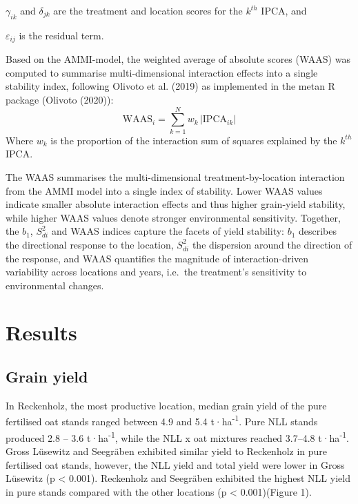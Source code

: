\documentclass[
  british,
  a4paper,
  DIV=11,
  numbers=noendperiod]{scrreprt}
\begin{document}
\(\gamma_{ik}\) and \(\delta_{jk}\) are the treatment and location
scores for the \(k^{th}\) IPCA, and

\(\varepsilon_{ij}\) is the residual term.

Based on the AMMI-model, the weighted average of absolute scores (WAAS)
was computed to summarise multi‐dimensional interaction effects into a
single stability index, following Olivoto et al. (2019) as implemented
in the metan R package (Olivoto (2020)): \[
\text{WAAS}_i = \sum_{k=1}^{N} w_k \, \big| \text{IPCA}_{ik} \big| \tag{5}
\] Where \(w_k\) is the proportion of the interaction sum of squares
explained by the \(k^{th}\) IPCA.

The WAAS summarises the multi-dimensional treatment-by-location
interaction from the AMMI model into a single index of stability. Lower
WAAS values indicate smaller absolute interaction effects and thus
higher grain-yield stability, while higher WAAS values denote stronger
environmental sensitivity. Together, the \(b_{1}\), \(S^2_{di}\) and
WAAS indices capture the facets of yield stability: \(b_{1}\) describes
the directional response to the location, \(S^2_{di}\) the dispersion
around the direction of the response, and WAAS quantifies the magnitude
of interaction-driven variability across locations and years, i.e.~the
treatment's sensitivity to environmental changes.

\chapter{Results}\label{results}

\section{Grain yield}\label{grain-yield}

In Reckenholz, the most productive location, median grain yield of the
pure fertilised oat stands ranged between 4.9 and 5.4
t·ha\textsuperscript{-1}. Pure NLL stands produced 2.8 -- 3.6
t·ha\textsuperscript{-1}, while the NLL x oat mixtures reached 3.7--4.8
t·ha\textsuperscript{-1}. Gross Lüsewitz and Seegräben exhibited similar
yield to Reckenholz in pure fertilised oat stands, however, the NLL
yield and total yield were lower in Gross Lüsewitz (p \textless{}
0.001). Reckenholz and Seegräben exhibited the highest NLL yield in pure
stands compared with the other locations (p \textless{} 0.001)(Figure
1).
\end{document}
